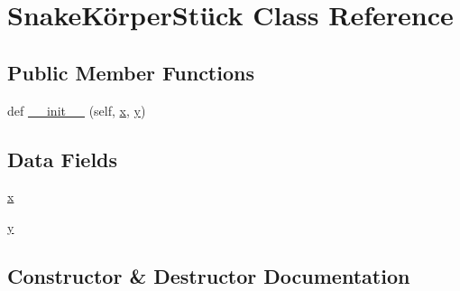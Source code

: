 \hypertarget{class_snake_01_projekt_01auf_01_python_1_1_snake_k_xC3_xB6rper_st_xC3_xBCck}{}\section{Snake\+Körper\+Stück Class Reference}
\label{class_snake_01_projekt_01auf_01_python_1_1_snake_k_xC3_xB6rper_st_xC3_xBCck}
\subsection*{Public Member Functions}
\begin{DoxyCompactItemize}
\item 
def \mbox{\hyperlink{class_snake_01_projekt_01auf_01_python_1_1_snake_k_xC3_xB6rper_st_xC3_xBCck_a920a2e8c450da87a2461e7913e14cb22}{\+\_\+\+\_\+init\+\_\+\+\_\+}} (self, \mbox{\hyperlink{class_snake_01_projekt_01auf_01_python_1_1_snake_k_xC3_xB6rper_st_xC3_xBCck_a9336ebf25087d91c818ee6e9ec29f8c1}{x}}, \mbox{\hyperlink{class_snake_01_projekt_01auf_01_python_1_1_snake_k_xC3_xB6rper_st_xC3_xBCck_a2fb1c5cf58867b5bbc9a1b145a86f3a0}{y}})
\end{DoxyCompactItemize}
\subsection*{Data Fields}
\begin{DoxyCompactItemize}
\item 
\mbox{\hyperlink{class_snake_01_projekt_01auf_01_python_1_1_snake_k_xC3_xB6rper_st_xC3_xBCck_a9336ebf25087d91c818ee6e9ec29f8c1}{x}}
\item 
\mbox{\hyperlink{class_snake_01_projekt_01auf_01_python_1_1_snake_k_xC3_xB6rper_st_xC3_xBCck_a2fb1c5cf58867b5bbc9a1b145a86f3a0}{y}}
\end{DoxyCompactItemize}


\subsection{Constructor \& Destructor Documentation}
\mbox{\label{class_snake_01_projekt_01auf_01_python_1_1_snake_k_xC3_xB6rper_st_xC3_xBCck_a920a2e8c450da87a2461e7913e14cb22}} 
